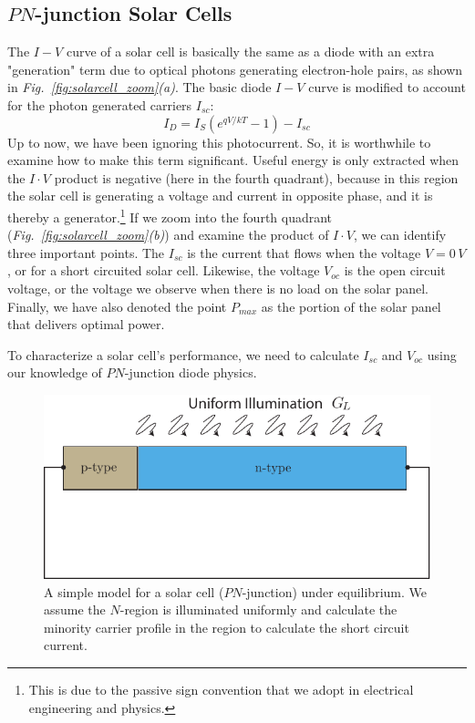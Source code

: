 \subsection{\texorpdfstring{$PN$}{PN}-junction Solar Cells}
The $I-V$ curve of a solar cell is basically the same as a diode with an extra "generation" term  due to optical photons generating electron-hole pairs, as shown in \emph{Fig.~\ref{fig:solarcell_zoom}(a)}.  The basic diode $I-V$ curve is modified to account for the photon generated carriers $I_{sc}$:
    \begin{equation} 
        I_D = I_S (e^{qV/kT} - 1) - I_{sc}
    \end{equation}
Up to now, we have been ignoring this photocurrent. So, it is worthwhile to examine how to make this term significant.  Useful energy is only extracted when the $I\cdot V$ product is negative (here in the fourth quadrant), because in this region the solar cell is generating a voltage and current in opposite phase, and it is thereby a generator.\footnote{This is due to the passive sign convention that we adopt in electrical engineering and physics.}  If we zoom into the fourth quadrant \big(\emph{Fig.~\ref{fig:solarcell_zoom}(b)}\big) and examine the product of $I\cdot V$, we can identify three important points.  The $I_{sc}$ is the current that flows when the voltage $V = 0\,V$, or for a short circuited solar cell.  Likewise, the voltage $V_{oc}$ is the open circuit voltage, or the voltage we observe when there is no load on the solar panel.  Finally, we have also denoted the point $P_{max}$ as the portion of the solar panel that delivers optimal power.

To characterize a solar cell's performance, we need to calculate $I_{sc}$ and $V_{oc}$ using our knowledge of $PN$-junction diode physics.
\begin{figure}[t]
\centering
\includegraphics[width=.8\columnwidth]{pn_solar_cell}
\caption{A simple model for a solar cell ($PN$-junction) under equilibrium.  We assume the $N$-region is illuminated uniformly and calculate the minority carrier profile in the region to calculate the short circuit current.}
\label{fig:pn_solar_cell}
\end{figure}
